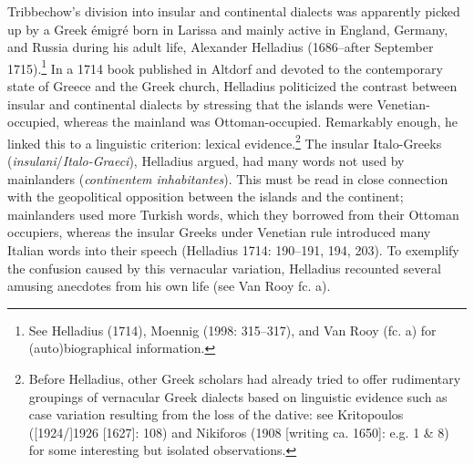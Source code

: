 \begin{styleStandard}
Tribbechow’s division into insular and continental dialects was apparently picked up by a Greek émigré born in Larissa and mainly active in England, Germany, and Russia during his adult life, Alexander Helladius (1686–after September 1715).\footnote{ See Helladius (1714), Moennig (1998: 315–317), and Van Rooy (fc. a) for (auto)biographical information.} In a 1714 book published in Altdorf and devoted to the contemporary state of Greece and the Greek church, Helladius politicized the contrast between insular and continental dialects by stressing that the islands were Venetian-occupied, whereas the mainland was Ottoman-occupied. Remarkably enough, he linked this to a linguistic criterion: lexical evidence.\footnote{ Before Helladius, other Greek scholars had already tried to offer rudimentary groupings of vernacular Greek dialects based on linguistic evidence such as case variation resulting from the loss of the dative: see Kritopoulos ([1924/]1926 [1627]: 108) and Nikiforos (1908 [writing ca. 1650]: e.g. 1 \& 8) for some interesting but isolated observations.} The insular Italo-Greeks (\textit{insulani}/\textit{Italo-Graeci}), Helladius argued, had many words not used by mainlanders (\textit{continentem inhabitantes}). This must be read in close connection with the geopolitical opposition between the islands and the continent; mainlanders used more Turkish words, which they borrowed from their Ottoman occupiers, whereas the insular Greeks under Venetian rule introduced many Italian words into their speech (Helladius 1714: 190–191, 194, 203). To exemplify the confusion caused by this vernacular variation, Helladius recounted several amusing anecdotes from his own life (see Van Rooy fc. a).
\end{styleStandard}

